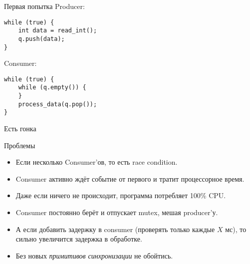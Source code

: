 \begin{frame}[fragile]{Первая попытка}
	Producer:
\begin{verbatim}
while (true) {
    int data = read_int();
    q.push(data);
}
\end{verbatim}
	Consumer:
	\pause
\begin{verbatim}
while (true) {
    while (q.empty()) {
    }
    process_data(q.pop());
}
\end{verbatim}
\end{frame}

\begin{frame}{Есть гонка}
\end{frame}

\begin{frame}{Проблемы}
	\begin{itemize}
		\item Если несколько Consumer'ов, то есть race condition.
		\item Consumer активно ждёт событие от первого и тратит процессорное время.
		\item Даже если ничего не происходит, программа потребляет 100\% CPU.
		\item Consumer постоянно берёт и отпускает mutex, мешая producer'у.
		\pause
		\item
			А если добавить задержку в consumer (проверять только каждые $X$ мс),
			то сильно увеличится задержка в обработке.
		\item Без новых \textit{примитивов синхронизации} не обойтись.
	\end{itemize}
\end{frame}
